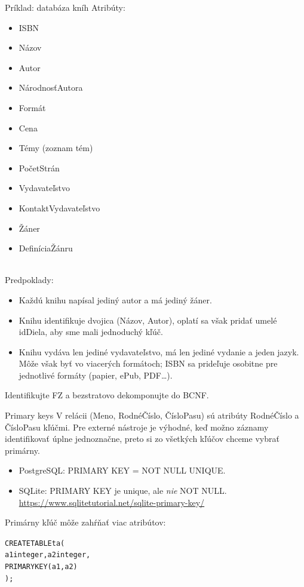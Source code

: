 \documentclass[12pt]{beamer}
\begin{document}
\begin{frame}[fragile]{Príklad: databáza kníh}
Atribúty:\\[3mm]
\begin{minipage}{.4\pdfpagewidth}
\scriptsize
\begin{itemize}
\item ISBN
\item Názov
\item Autor
\item NárodnosťAutora
\item Formát
\item Cena
\end{itemize}
\end{minipage}
\begin{minipage}{.4\pdfpagewidth}
\scriptsize
\begin{itemize}
\item Témy (zoznam tém)
\item PočetStrán
\item Vydavateľstvo
\item KontaktVydavateľstvo
\item Žáner
\item DefiníciaŽánru
\end{itemize}
\end{minipage}
\\[3mm]
Predpoklady:
{
\footnotesize
\begin{itemize}
\item Každú knihu napísal jediný autor a má jediný žáner.
\item Knihu identifikuje dvojica (Názov, Autor), oplatí sa však pridať umelé idDiela, aby sme mali jednoduchý kľúč.
\item Knihu vydáva len jediné vydavateľstvo, má len jediné vydanie a jeden jazyk.
    Môže však byť vo viacerých formátoch; ISBN sa prideľuje osobitne pre jednotlivé formáty (papier, ePub, PDF\dots).
\end{itemize}
}
Identifikujte FZ a bezstratovo dekomponujte do BCNF.
\end{frame}

\begin{frame}[fragile]{Primary keys}
V relácii (Meno, RodnéČíslo, ČísloPasu) sú atribúty RodnéČíslo a ČísloPasu kľúčmi.
Pre externé nástroje je výhodné, keď možno záznamy identifikovať úplne jednoznačne,
preto si zo všetkých kľúčov chceme vybrať primárny.
\begin{itemize}
\item PostgreSQL: \alert{PRIMARY KEY} = NOT NULL UNIQUE.
\item SQLite: PRIMARY KEY je unique, ale \emph{nie} NOT NULL.\\
      {\scriptsize \url{https://www.sqlitetutorial.net/sqlite-primary-key/}}
\end{itemize}

\bigskip
Primárny kľúč môže zahŕňať viac atribútov:
\begin{alltt}
CREATE TABLE ta (
  a1 integer, a2 integer,
  \alert{PRIMARY KEY (a1, a2)}
);
\end{alltt}
\end{frame}
\end{document}
